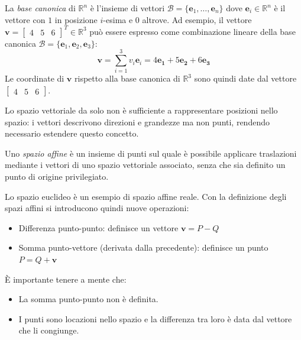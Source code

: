 \begin{esempio}
    La \emph{base canonica} di $\mathbb{R}^n$ è l'insieme di vettori $\mathcal{B} = \{\mathbf{e}_1, \ldots, \mathbf{e}_n\}$ dove $\mathbf{e}_i \in \mathbb{R}^n$ è il vettore con $1$ in posizione $i$-esima e $0$ altrove.
    Ad esempio, il vettore $\mathbf{v} = \begin{bmatrix}4 & 5 & 6\end{bmatrix}^T \in \mathbb{R}^3$ può essere espresso come combinazione lineare della base canonica $\mathcal{B} = \{\mathbf{e}_1, \mathbf{e}_2, \mathbf{e}_3\}$:
    \[
        \mathbf{v} = \sum_{i=1}^{3} v_i \mathbf{e}_i
        = 4 \mathbf{e_1}
        + 5 \mathbf{e_2}
        + 6 \mathbf{e_3}
    \]
    Le coordinate di $\mathbf{v} $ rispetto alla base canonica di $\mathbb{R}^3$ sono quindi date dal vettore $\begin{bmatrix}4 & 5 & 6\end{bmatrix}$.
\end{esempio}

Lo spazio vettoriale da solo non è sufficiente a rappresentare posizioni nello spazio: i vettori descrivono direzioni e grandezze ma non punti, rendendo necessario estendere questo concetto.

\begin{definizione}
    Uno \emph{spazio affine} è un insieme di punti sul quale è possibile applicare traslazioni mediante i vettori di uno spazio vettoriale associato, senza che sia definito un punto di origine privilegiato.
\end{definizione}

Lo spazio euclideo è un esempio di spazio affine reale.
Con la definizione degli spazi affini si introducono quindi nuove operazioni:
\begin{itemize}
    \item Differenza punto-punto: definisce un vettore $\mathbf{v} = P - Q$
    \item Somma punto-vettore (derivata dalla precedente): definisce un punto $P = Q + \mathbf{v}$
\end{itemize}

\begin{osservazione}
    È importante tenere a mente che:
    \begin{itemize}
        \item La somma punto-punto non è definita.
        \item I punti sono locazioni nello spazio e la differenza tra loro è data dal vettore che li congiunge.
    \end{itemize}
\end{osservazione}

